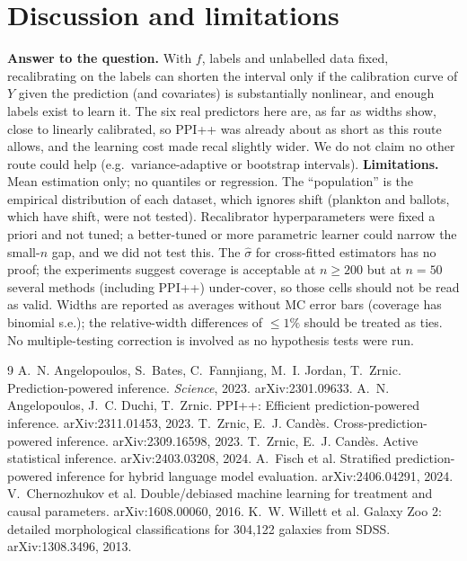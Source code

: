 \documentclass{article}
\begin{document}
\section{Discussion and limitations}
\textbf{Answer to the question.} With $f$, labels and unlabelled data fixed, recalibrating on the labels can shorten the interval only if the calibration curve of $Y$ given the prediction (and covariates) is substantially nonlinear, and enough labels exist to learn it. The six real predictors here are, as far as widths show, close to linearly calibrated, so PPI++ was already about as short as this route allows, and the learning cost made recal slightly wider. We do not claim no other route could help (e.g.\ variance-adaptive or bootstrap intervals).
\textbf{Limitations.} Mean estimation only; no quantiles or regression. The ``population'' is the empirical distribution of each dataset, which ignores shift (plankton and ballots, which have shift, were not tested). Recalibrator hyperparameters were fixed a priori and not tuned; a better-tuned or more parametric learner could narrow the small-$n$ gap, and we did not test this. The $\hat\sigma$ for cross-fitted estimators has no proof; the experiments suggest coverage is acceptable at $n\ge200$ but at $n=50$ several methods (including PPI++) under-cover, so those cells should not be read as valid. Widths are reported as averages without MC error bars (coverage has binomial s.e.); the relative-width differences of $\le 1\%$ should be treated as ties. No multiple-testing correction is involved as no hypothesis tests were run.


\begin{thebibliography}{9}
 A.~N. Angelopoulos, S.~Bates, C.~Fannjiang, M.~I. Jordan, T.~Zrnic. Prediction-powered inference. \emph{Science}, 2023. arXiv:2301.09633.
 A.~N. Angelopoulos, J.~C. Duchi, T.~Zrnic. PPI++: Efficient prediction-powered inference. arXiv:2311.01453, 2023.
 T.~Zrnic, E.~J. Cand\`es. Cross-prediction-powered inference. arXiv:2309.16598, 2023.
 T.~Zrnic, E.~J. Cand\`es. Active statistical inference. arXiv:2403.03208, 2024.
 A.~Fisch et al. Stratified prediction-powered inference for hybrid language model evaluation. arXiv:2406.04291, 2024.
 V.~Chernozhukov et al. Double/debiased machine learning for treatment and causal parameters. arXiv:1608.00060, 2016.
 K.~W. Willett et al. Galaxy Zoo 2: detailed morphological classifications for 304,122 galaxies from SDSS. arXiv:1308.3496, 2013.
\end{thebibliography}
\appendix
\end{document}
